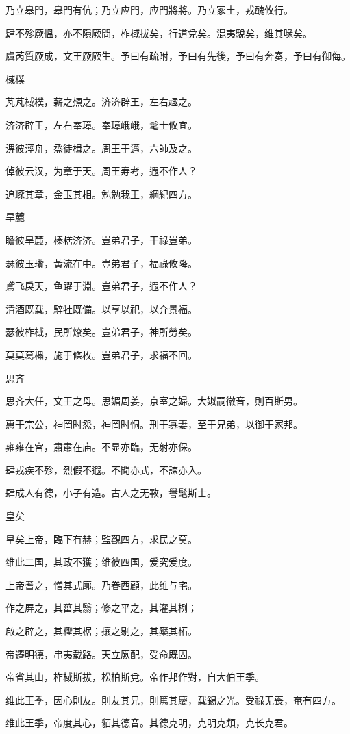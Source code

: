 乃立皋門，皋門有伉；乃立应門，应門將將。乃立冢土，戎醜攸行。

肆不殄厥慍，亦不隕厥問，柞棫拔矣，行道兌矣。混夷駾矣，维其喙矣。

虞芮質厥成，文王厥厥生。予曰有疏附，予曰有先後，予曰有奔奏，予曰有御侮。

棫樸

芃芃棫樸，薪之槱之。济济辟王，左右趣之。

济济辟王，左右奉璋。奉璋峨峨，髦士攸宜。

淠彼涇舟，烝徒楫之。周王于邁，六師及之。

倬彼云汉，为章于天。周王寿考，遐不作人？

追琢其章，金玉其相。勉勉我王，綱紀四方。

旱麓

瞻彼旱麓，榛楛济济。豈弟君子，干祿豈弟。

瑟彼玉瓚，黃流在中。豈弟君子，福祿攸降。

鳶飞戾天，鱼躍于淵。豈弟君子，遐不作人？

清酒既载，騂牡既備。以享以祀，以介景福。

瑟彼柞棫，民所燎矣。豈弟君子，神所勞矣。

莫莫葛櫑，施于條枚。豈弟君子，求福不回。

思齐

思齐大任，文王之母。思媚周姜，京室之婦。大姒嗣徽音，則百斯男。

惠于宗公，神罔时怨，神罔时恫。刑于寡妻，至于兄弟，以御于家邦。

雍雍在宮，肅肅在庙。不显亦臨，无射亦保。

肆戎疾不殄，烈假不遐。不聞亦式，不諫亦入。

肆成人有德，小子有造。古人之无斁，譽髦斯士。

皇矣

皇矣上帝，臨下有赫；監觀四方，求民之莫。

维此二国，其政不獲；维彼四国，爰究爰度。

上帝耆之，憎其式廓。乃眷西顧，此维与宅。

作之屏之，其菑其翳；修之平之，其灌其栵；

啟之辟之，其檉其椐；攘之剔之，其檿其柘。

帝遷明德，串夷载路。天立厥配，受命既固。

帝省其山，柞棫斯拔，松柏斯兌。帝作邦作對，自大伯王季。

维此王季，因心則友。則友其兄，則篤其慶，载錫之光。受祿无喪，奄有四方。

维此王季，帝度其心，貊其德音。其德克明，克明克類，克长克君。

